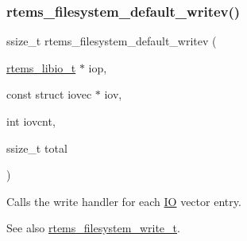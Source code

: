 \subsubsection{\texorpdfstring{rtems\_filesystem\_default\_writev()}{rtems\_filesystem\_default\_writev()}}
{\footnotesize\ttfamily ssize\+\_\+t rtems\+\_\+filesystem\+\_\+default\+\_\+writev (\begin{DoxyParamCaption}\item[{\mbox{\hyperlink{structrtems__libio__tt}{rtems\+\_\+libio\+\_\+t}} $\ast$}]{iop,  }\item[{const struct iovec $\ast$}]{iov,  }\item[{int}]{iovcnt,  }\item[{ssize\+\_\+t}]{total }\end{DoxyParamCaption})}



Calls the write handler for each \mbox{\hyperlink{structIO}{IO}} vector entry. 

\begin{DoxySeeAlso}{See also}
\mbox{\hyperlink{group__LibIOFSHandler_gacbc1d51a1699693e340b3e31f7f62611}{rtems\+\_\+filesystem\+\_\+write\+\_\+t}}. 
\end{DoxySeeAlso}
